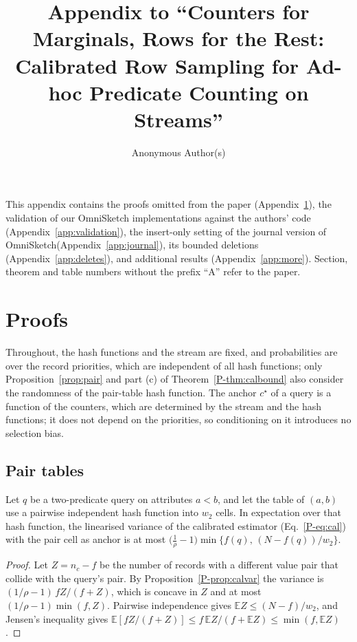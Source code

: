 \documentclass[sigconf,review,anonymous]{acmart}
\newcommand{\omni}{OmniSketch\xspace}
\newcommand{\E}{\mathbb{E}}
\newcommand{\pref}[1]{\ref{P-#1}}
\begin{document}
\title{Appendix to ``Counters for Marginals, Rows for the Rest: Calibrated Row Sampling for Ad-hoc
Predicate Counting on Streams''}
\author{Anonymous Author(s)}
\maketitle

\noindent This appendix contains the proofs omitted from the paper (Appendix~\ref{app:proofs}), the
validation of our \omni implementations against the authors' code (Appendix~\ref{app:validation}), the
insert-only setting of the journal version of \omni (Appendix~\ref{app:journal}), its bounded deletions
(Appendix~\ref{app:deletes}), and additional results (Appendix~\ref{app:more}). Section, theorem and table numbers without the prefix ``A'' refer to the paper.

\appendix

\section{Proofs}\label{app:proofs}

Throughout, the hash functions and the stream are fixed, and probabilities are over the record
priorities, which are independent of all hash functions; only Proposition~\ref{prop:pair} and part (c)
of Theorem~\pref{thm:calbound} also consider the randomness of the pair-table hash function. The anchor $c^\star$ of a query is a function of the counters, which are determined by the
stream and the hash functions; it does not depend on the priorities, so conditioning on it introduces no
selection bias.

\subsection{Pair tables}

\begin{proposition}\label{prop:pair}
Let $q$ be a two-predicate query on attributes $a<b$, and let the table of $(a,b)$ use a pairwise
independent hash function into $w_2$ cells. In expectation over that hash function, the linearised
variance of the calibrated estimator (Eq.~\pref{eq:cal}) with the pair cell as anchor is at most
$\bigl(\tfrac1\rho-1\bigr)\min\bigl\{f(q),\,(N-f(q))/w_2\bigr\}$.
\end{proposition}
\begin{proof}
Let $Z=n_c-f$ be the number of records with a different value pair that collide with the query's pair.
By Proposition~\pref{prop:calvar} the variance is $(1/\rho-1)\,fZ/(f+Z)$, which is concave in $Z$ and at
most $(1/\rho-1)\min(f,Z)$. Pairwise independence gives $\E Z\le(N-f)/w_2$, and Jensen's inequality
gives $\E[fZ/(f+Z)]\le f\,\E Z/(f+\E Z)\le\min(f,\E Z)$.
\end{proof}
\end{document}
